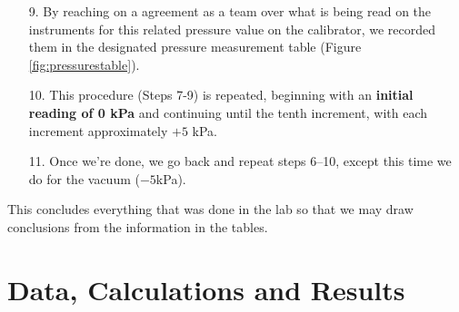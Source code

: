 \documentclass{article}
\begin{document}
	\begin{minipage}{0.51\textwidth}\vspace{-2em}\raggedright
		\begin{enumerate}[left=0in]
			\item[9.]  By reaching on a agreement as a team over what is being read on the instruments for this related pressure value on the calibrator, we recorded them in the designated pressure measurement table (Figure \ref{fig:pressurestable}). 
			\item[10.] This procedure (Steps 7-9) is repeated, beginning with an \textbf{initial reading of 0 kPa} and continuing until the tenth increment, with each increment approximately $+5$ kPa.
			\item[11.] Once we're done, we go back and repeat steps 6–10, except this time we do for the vacuum ($-5$kPa).
		\end{enumerate}\noindent
		This concludes everything that was done in the lab so that we may draw conclusions from the information in the tables.
	\end{minipage}
	

	\newpage{}
	\section{Data, Calculations and Results}
	\tikzexternaldisable
\end{document}
